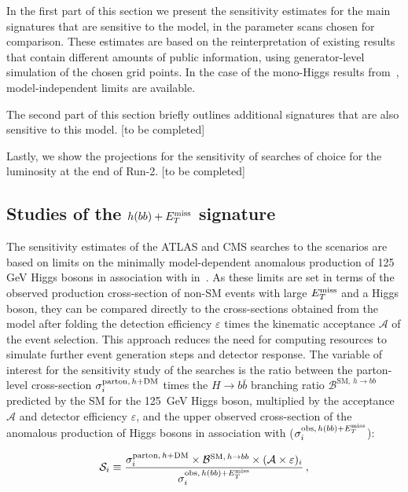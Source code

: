 In the first part of this section we present the sensitivity estimates for the main signatures that are sensitive to the model, in the parameter scans chosen for comparison. These estimates are based on the reinterpretation of existing results that contain different amounts of public information, using generator-level simulation of the chosen grid points. In the case of the mono-Higgs results from~\cite{Aaboud:2017yqz}, model-independent limits are available. 

The second part of this section briefly outlines additional signatures that are also sensitive to this model. [to be completed]

Lastly, we show the projections for the sensitivity of searches of choice for the luminosity at the end of Run-2. [to be completed]

\subsection{Studies of the $h(bb)+E_T^\mathrm{miss}$ signature}
\label{sec:sensi_monohbb}
%

The sensitivity estimates of the ATLAS and CMS \monohbb searches to the \hdma scenarios are based on limits on the minimally model-dependent anomalous production of 125 GeV Higgs bosons in association with \met in~\cite{Aaboud:2017yqz}. 
As these limits are set in terms of the observed production cross-section of non-SM events with large $E_T^\mathrm{miss}$ and a Higgs boson, they can be compared directly to the cross-sections obtained from the \hdma model after folding the detection efficiency $\varepsilon$ times the kinematic acceptance $\mathcal{A}$ of the event selection. This approach reduces the need for computing resources to simulate further event generation steps and detector response. 
The variable of interest for the sensitivity study of the \monohbb searches is the ratio between the parton-level cross-section $\sigma_{i}^{\mathrm{parton},\,h+\textrm{DM}}$ times the $H\rightarrow b\bar{b}$ branching ratio $\mathcal{B}^{\mathrm{SM},\,h\to bb}$ predicted by the SM for the 125~GeV Higgs boson, multiplied by the acceptance $\mathcal{A}$ and detector efficiency $\varepsilon$, and the upper observed cross-section of the anomalous production of Higgs bosons in association with \met ($\sigma_{i}^{\mathrm{obs},\,h(bb)+E_T^\mathrm{miss}}$):

\begin{equation}
\label{eq:monoHbb_sensi}
\mathcal{S}_i \equiv \frac{\sigma_{i}^{\mathrm{parton},\,h+\textrm{DM}} \times \mathcal{B}^{\mathrm{SM},\,h\to bb} \times (\mathcal{A\times\varepsilon})_{i} }
{\sigma_{i}^{\mathrm{obs},\,h(bb)+E_T^\mathrm{miss}}}\,,
\end{equation}

